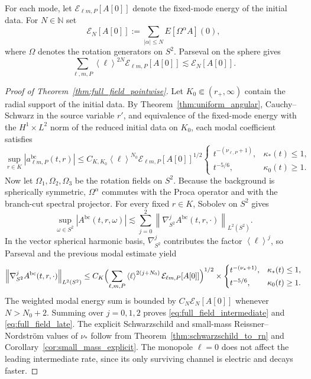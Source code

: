 \documentclass[12pt]{article}
\numberwithin{equation}{section}
\theoremstyle{plain}
\theoremstyle{definition}
\theoremstyle{remark}
\newcommand{\N}{\mathbb N}
\newcommand{\bc}{\mathrm{bc}}
\newcommand{\kap}{\kappa}
\newcommand{\angles}[1]{\left\langle #1 \right\rangle}
\newcommand{\abs}[1]{\left|#1\right|}
\newcommand{\norm}[1]{\left\|#1\right\|}
\begin{document}
For each mode, let $\mathcal E_{\ell m,P}[A[0]]$ denote the fixed-mode energy of the initial data.  For $N\in\N$ set
\[
   \mathcal E_N[A[0]]
   :=
   \sum_{|\alpha|\le N}E[\Omega^\alpha A](0),
\]
where $\Omega$ denotes the rotation generators on $S^2$.  Parseval on the sphere gives
\[
   \sum_{\ell,m,P}\angles{\ell}^{2N}\mathcal E_{\ell m,P}[A[0]]
   \lesssim
   \mathcal E_N[A[0]].
\]

\begin{proof}[Proof of Theorem~\ref{thm:full_field_pointwise}]
Let $K_0\Subset(r_+,\infty)$ contain the radial support of the initial data.  By Theorem~\ref{thm:uniform_angular}, Cauchy--Schwarz in the source variable $r'$, and equivalence of the fixed-mode energy with the $H^1\times L^2$ norm of the reduced initial data on $K_0$, each modal coefficient satisfies
\[
   \sup_{r\in K}\abs{a_{\ell m,P}^{\bc}(t,r)}
   \le
   C_{K,K_0}\angles{\ell}^{N_0}\mathcal E_{\ell m,P}[A[0]]^{1/2}
   \begin{cases}
      t^{-(\nu_{\ell,P}+1)}, & \kap_*(t)\le1,\\[0.5ex]
      t^{-5/6}, & \kap_0(t)\ge1.
   \end{cases}
\]
Now let $\Omega_1,\Omega_2,\Omega_3$ be the rotation fields on $S^2$.  Because the background is spherically symmetric, $\Omega^\alpha$ commutes with the Proca operator and with the branch-cut spectral projector.  For every fixed $r\in K$, Sobolev on $S^2$ gives
\[
   \sup_{\omega\in S^2}\abs{A^{\bc}(t,r,\omega)}
   \lesssim
   \sum_{j=0}^2\norm{\nabla_{S^2}^jA^{\bc}(t,r,\cdot)}_{L^2(S^2)}.
\]
In the vector spherical harmonic basis, $\nabla_{S^2}^j$ contributes the factor $\angles{\ell}^j$, so Parseval and the previous modal estimate yield
\[
   \norm{\nabla_{S^2}^jA^{\bc}(t,r,\cdot)}_{L^2(S^2)}
   \le
   C_K\Bigl(\sum_{\ell,m,P}\angles{\ell}^{2(j+N_0)}\mathcal E_{\ell m,P}[A[0]]\Bigr)^{1/2}
   \times
   \begin{cases}
      t^{-(\nu_*+1)}, & \kap_*(t)\le1,\\[0.5ex]
      t^{-5/6}, & \kap_0(t)\ge1.
   \end{cases}
\]
The weighted modal energy sum is bounded by $C_N\mathcal E_N[A[0]]$ whenever $N>N_0+2$.  Summing over $j=0,1,2$ proves \eqref{eq:full_field_intermediate} and \eqref{eq:full_field_late}.  The explicit Schwarzschild and small-mass Reissner--Nordstr\"om values of $\nu_*$ follow from Theorem~\ref{thm:schwarzschild_to_rn} and Corollary~\ref{cor:small_mass_explicit}.  The monopole $\ell=0$ does not affect the leading intermediate rate, since its only surviving channel is electric and decays faster.
\end{proof}
\end{document}
